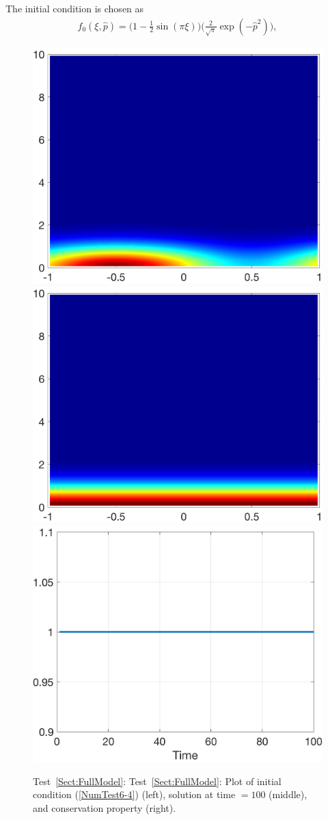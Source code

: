 \documentclass[preprint,11pt]{elsarticle}
\begin{document}
The initial condition is chosen as 
\begin{eqnarray}
 f_0(\xi,\hat{p})=\bigg(1-\frac{1}{2}\sin(\pi \xi)\bigg) \bigg(\frac{2}{\sqrt{\pi}}\exp(-\hat{p}^2)\bigg), \label{NumTest6-4}
\end{eqnarray}

\begin{figure}[H]
\centering
\includegraphics[width=.32\textwidth]{./NumFig/FullModel2D-4-0}
\includegraphics[width=.32\textwidth]{./NumFig/FullModel2D-4-100}
\includegraphics[width=.32\textwidth]{./NumFig/FullModel2D-4-conv}
\caption{Test~\ref{Sect:FullModel}: Test~\ref{Sect:FullModel}: Plot of initial condition (\ref{NumTest6-4}) (left), solution at time $= 100$ (middle), and conservation property (right).}
\end{figure}
\end{document}
